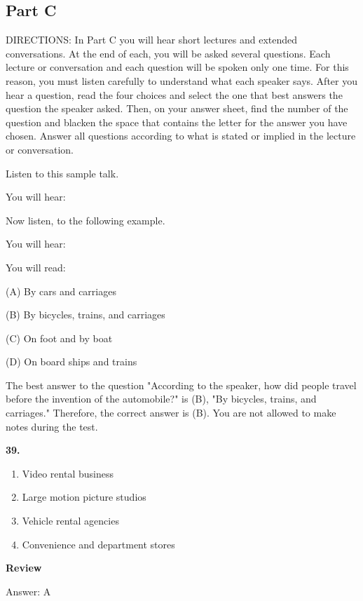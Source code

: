 \documentclass[12pt]{article}
\begin{document}
\subsection*{Part C}
DIRECTIONS: In Part C you will hear short lectures and extended conversations. At the end of each, you will be asked several questions. Each lecture or conversation and each question will be spoken only one time. For this reason, you must listen carefully to understand what each speaker says. After you hear a question, read the four choices and select the one that best answers the question the speaker asked. Then, on your answer sheet, find the number of the question and blacken the space that contains the letter for the answer you have chosen. Answer all questions according to what is stated or implied in the lecture or conversation.\par
\begin{exampleblock}
Listen to this sample talk.\par
You will hear:\par
Now listen, to the following example.\par
You will hear:\par
You will read:\par
(A) By cars and carriages\par
(B) By bicycles, trains, and carriages\par
(C) On foot and by boat\par
(D) On board ships and trains\par
The best answer to the question "According to the speaker, how did people travel before the invention of the automobile?" is (B), "By bicycles, trains, and carriages." Therefore, the correct answer is (B). You are not allowed to make notes during the test.\par
\end{exampleblock}
\noindent\textbf{39.}
\begin{enumerate}[label=(\Alph*),leftmargin=*,itemsep=0.2em]
\item Video rental business
\item Large motion picture studios
\item Vehicle rental agencies
\item Convenience and department stores
\end{enumerate}
\par
\begingroup
\setlength{\parskip}{0pt}
\setlength{\parindent}{0pt}
\textbf{Review}\par
Answer: A\par
\end{document}
